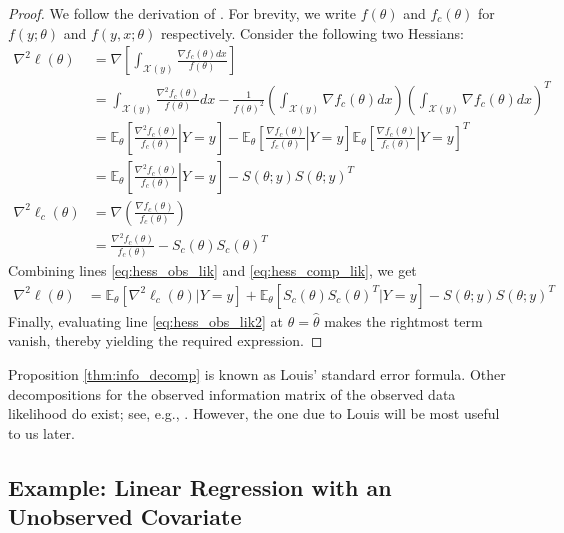 \documentclass[11pt, oneside]{article}   	%
\newcommand{\bE}{\mathbb{E}}
\begin{document}
\begin{proof}
    We follow the derivation of \citet{Lou82}. For brevity, we write $f(\theta)$ and $f_c(\theta)$ for $f(y; \theta)$ and $f(y, x; \theta)$ respectively. Consider the following two Hessians:
    \begin{align}
        \nabla^2 \ell(\theta) &= \nabla \left[ \int_{\mathcal{X}(y)} \frac{\nabla f_c(\theta) dx}{f(\theta)} \right]\\
        &= \int_{\mathcal{X}(y)} \frac{\nabla^2 f_c(\theta)}{f(\theta)} dx - \frac{1}{f(\theta)^2}\left( \int_{\mathcal{X}(y)} \nabla f_c(\theta) dx \right) \left( \int_{\mathcal{X}(y)} \nabla f_c(\theta) dx \right)^T\\
        &= \bE_\theta \left[ \left. \frac{\nabla^2 f_c(\theta)}{f_c(\theta)} \right| Y=y \right] - \bE_\theta \left[ \left. \frac{\nabla f_c(\theta)}{f_c(\theta)} \right| Y=y \right] \bE_\theta \left[ \left. \frac{\nabla f_c(\theta)}{f_c(\theta)} \right| Y=y \right]^T\\
        &= \bE_\theta \left[ \left. \frac{\nabla^2 f_c(\theta)}{f_c(\theta)} \right| Y=y \right] - S(\theta; y) S(\theta; y)^T \label{eq:hess_obs_lik}\\
        \nabla^2 \ell_c(\theta) &= \nabla \left( \frac{\nabla f_c(\theta)}{f_c(\theta)} \right)\\
        &= \frac{\nabla^2 f_c(\theta)}{f_c(\theta)} - S_c(\theta) S_c(\theta)^T \label{eq:hess_comp_lik}
    \end{align}
    Combining lines \ref{eq:hess_obs_lik} and \ref{eq:hess_comp_lik}, we get
    \begin{align}
        \nabla^2 \ell(\theta) &= \bE_\theta [ \nabla^2 \ell_c(\theta) | Y=y] + \bE_\theta [ S_c(\theta) S_c(\theta)^T | Y=y] - S(\theta; y) S(\theta; y)^T \label{eq:hess_obs_lik2}
    \end{align}
    Finally, evaluating line \ref{eq:hess_obs_lik2} at $\theta = \hat{\theta}$ makes the rightmost term vanish, thereby yielding the required expression.
\end{proof}

Proposition \ref{thm:info_decomp} is known as Louis' standard error formula. Other decompositions for the observed information matrix of the observed data likelihood do exist; see, e.g., \citet{Oak99,McL08}. However, the one due to Louis will be most useful to us later.

\subsection{Example: Linear Regression with an Unobserved Covariate}
\label{sec:eg-lin_reg}
\end{document}
